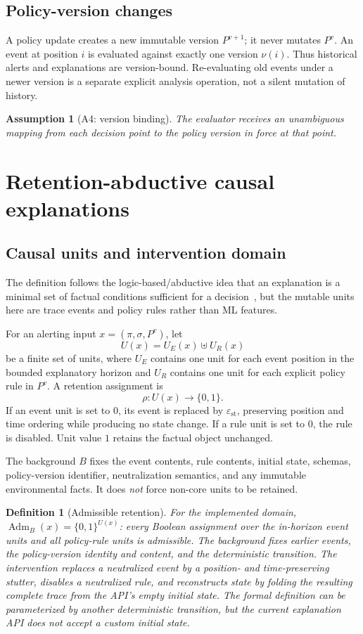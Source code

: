 \documentclass[11pt]{article}
\newtheorem{definition}{Definition}[section]
\newtheorem{assumption}{Assumption}[section]
\theoremstyle{remark}
\newcommand{\Adm}{\operatorname{Adm}}
\newcommand{\stutter}{\varepsilon_{\mathrm{st}}}
\begin{document}
\subsection{Policy-version changes}
A policy update creates a new immutable version $P^{v+1}$; it never mutates $P^v$. An event at position $i$ is evaluated against exactly one version $\nu(i)$. Thus historical alerts and explanations are version-bound. Re-evaluating old events under a newer version is a separate explicit analysis operation, not a silent mutation of history.

\begin{assumption}[A4: version binding]
The evaluator receives an unambiguous mapping from each decision point to the policy version in force at that point.
\end{assumption}

\section{Retention-abductive causal explanations}

\subsection{Causal units and intervention domain}
The definition follows the logic-based/abductive idea that an explanation is a minimal set of factual conditions sufficient for a decision~\citep{Ignatiev2019_r29}, but the mutable units here are trace events and policy rules rather than ML features.

For an alerting input $x=(\pi,\sigma,P^v)$, let
\[
U(x)=U_E(x)\uplus U_R(x)
\]
be a finite set of units, where $U_E$ contains one unit for each event position in the bounded explanatory horizon and $U_R$ contains one unit for each explicit policy rule in $P^v$. A retention assignment is
\[
\rho:U(x)\to\{0,1\}.
\]
If an event unit is set to $0$, its event is replaced by $\stutter$, preserving position and time ordering while producing no state change. If a rule unit is set to $0$, the rule is disabled. Unit value $1$ retains the factual object unchanged.

The background $B$ fixes the event contents, rule contents, initial state, schemas, policy-version identifier, neutralization semantics, and any immutable environmental facts. It does \emph{not} force non-core units to be retained.

\begin{definition}[Admissible retention]
For the implemented domain, $\Adm_B(x)=\{0,1\}^{U(x)}$: every Boolean assignment over the in-horizon event units and all policy-rule units is admissible. The background fixes earlier events, the policy-version identity and content, and the deterministic transition. The intervention replaces a neutralized event by a position- and time-preserving stutter, disables a neutralized rule, and reconstructs state by folding the resulting complete trace from the API's empty initial state. The formal definition can be parameterized by another deterministic transition, but the current explanation API does not accept a custom initial state.
\end{definition}
\end{document}

